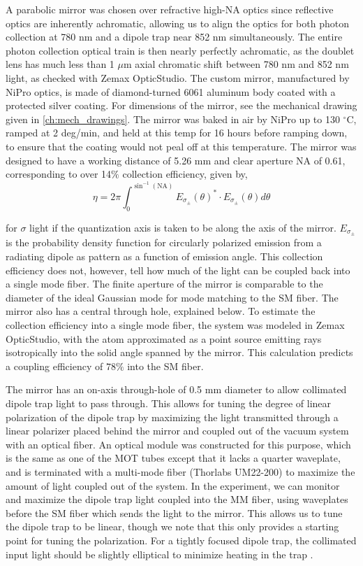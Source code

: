 A parabolic mirror was chosen over refractive high-NA optics since reflective optics are inherently achromatic, allowing us to align the optics for both photon collection at 780 nm and a dipole trap near 852 nm simultaneously. The entire photon collection optical train is then nearly perfectly achromatic, as the doublet lens has much less than 1 $\mu$m axial chromatic shift between 780 nm and 852 nm light, as checked with Zemax OpticStudio. The custom mirror, manufactured by NiPro optics, is made of diamond-turned 6061 aluminum body coated with a protected silver coating. For dimensions of the mirror, see the mechanical drawing given in \ref{ch:mech_drawings}. The mirror was baked in air by NiPro up to 130 $^{\circ}$C, ramped at 2 deg/min, and held at this temp for 16 hours before ramping down, to ensure that the coating would not peal off at this temperature. The mirror was designed to have a working distance of 5.26 mm and clear aperture NA of 0.61, corresponding to over 14$\%$ collection efficiency, given by,
\begin{equation}
    \eta = 2\pi\int_{0}^{\sin^{-1}(\text{NA})} E_{\sigma_{\pm}}(\theta)^{\ast} \cdot E_{\sigma_{\pm}}(\theta) d\theta 
\end{equation}

for $\sigma$ light if the quantization axis is taken to be along the axis of the mirror. $E_{\sigma_{\pm}}$ is the probability density function for circularly polarized emission from a radiating dipole as pattern as a function of emission angle. This collection efficiency does not, however, tell how much of the light can be coupled back into a single mode fiber. The finite aperture of the mirror is comparable to the diameter of the ideal Gaussian mode for mode matching to the SM fiber. The mirror also has a central through hole, explained below. To estimate the collection efficiency into a single mode fiber, the system was modeled in Zemax OpticStudio, with the atom approximated as a point source emitting rays isotropically into the solid angle spanned by the mirror. This calculation predicts a coupling efficiency of $78\%$ into the SM fiber.

The mirror has an on-axis through-hole of 0.5 mm diameter to allow collimated dipole trap light to pass through. This allows for tuning the degree of linear polarization of the dipole trap by maximizing the light transmitted through a linear polarizer placed behind the mirror and coupled out of the vacuum system with an optical fiber. An optical module was constructed for this purpose, which is the same as one of the MOT tubes except that it lacks a quarter waveplate, and is terminated with a multi-mode fiber (Thorlabs UM22-200) to maximize the amount of light coupled out of the system. In the experiment, we can monitor and maximize the dipole trap light coupled into the MM fiber, using waveplates before the SM fiber which sends the light to the mirror. This allows us to tune the dipole trap to be linear, though we note that this only provides a starting point for tuning the polarization. For a tightly focused dipole trap, the collimated input light should be slightly elliptical to minimize heating in the trap \cite{Garcia2018}. 

